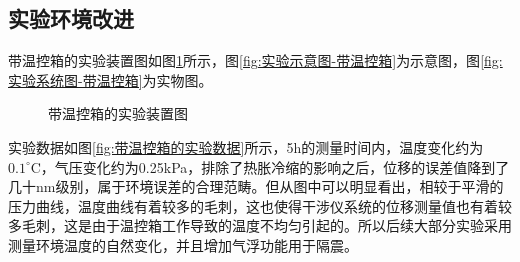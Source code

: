 \subsection{实验环境改进}
\label{section:实验环境改进}
带温控箱的实验装置图如图\ref{fig:带温控箱的实验装置图}所示，图\ref{fig:实验示意图-带温控箱}为示意图，图\ref{fig:实验系统图-带温控箱}为实物图。
\begin{figure}[htb]
    \centering
    \caption{带温控箱的实验装置图}
    \label{fig:带温控箱的实验装置图}
  \end{figure}
实验数据如图\ref{fig:带温控箱的实验数据}所示，5h的测量时间内，温度变化约为$0.1^{\circ} \mathrm{C}$，气压变化约为0.25kPa，排除了热胀冷缩的影响之后，位移的误差值降到了几十nm级别，属于环境误差的合理范畴。但从图中可以明显看出，相较于平滑的压力曲线，温度曲线有着较多的毛刺，这也使得干涉仪系统的位移测量值也有着较多毛刺，这是由于温控箱工作导致的温度不均匀引起的。所以后续大部分实验采用测量环境温度的自然变化，并且增加气浮功能用于隔震。
